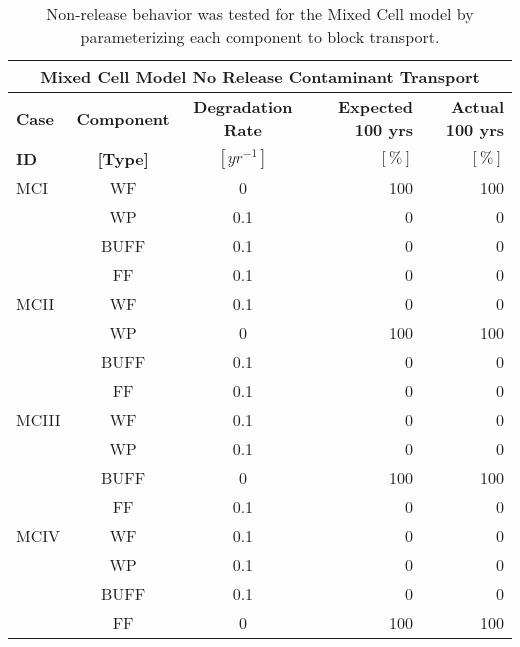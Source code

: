 \begin{table}
\centering
\footnotesize{
\begin{tabularx}{\textwidth}{|X|c|c|r|r|}
  \multicolumn{5}{c}{\textbf{Mixed Cell Model No Release Contaminant Transport}}\\
  \hline
  \textbf{Case}  &  \textbf{Component} &  \textbf{Degradation Rate} & \textbf{Expected 100 yrs} & \textbf{Actual 100 yrs}\\
  \textbf{ID}    & \textbf{[Type]} &  \textbf{$[yr^{-1}]$}  &  $[\%]$  & $[\%]$\\
  \hline
  MCI     &  WF    &  0   & 100 & 100 \\ 
          &  WP    &  0.1 & 0 & 0 \\ 
          &  BUFF  &  0.1 & 0 & 0 \\ 
          &  FF    &  0.1 & 0 & 0 \\ 
  \hline
  MCII    &  WF    &  0.1 & 0 & 0 \\ 
          &  WP    &  0   & 100 & 100 \\ 
          &  BUFF  &  0.1 & 0 & 0 \\ 
          &  FF    &  0.1 & 0 & 0 \\ 
  \hline
  MCIII   &  WF    &  0.1 & 0 & 0 \\ 
          &  WP    &  0.1 & 0 & 0 \\ 
          &  BUFF  &  0   & 100 & 100 \\ 
          &  FF    &  0.1 & 0 & 0 \\ 
  \hline
  MCIV    &  WF    &  0.1 & 0 & 0 \\ 
          &  WP    &  0.1 & 0 & 0 \\ 
          &  BUFF  &  0.1 & 0 & 0 \\ 
          &  FF    &  0   & 100 & 100 \\ 
  \hline
\end{tabularx}
\caption[Mixed Cell nuclide no release results.]{Non-release behavior was 
tested for the Mixed Cell model by parameterizing each component to block 
transport.}
\label{tab:mc_base}
}
\end{table}
